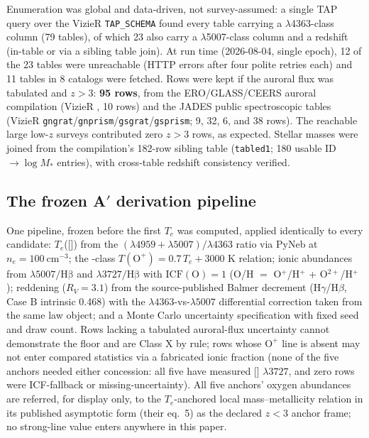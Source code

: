 \documentclass[twocolumn]{aastex702}
\newcommand{\te}{$T_e$}
\begin{document}
Enumeration was global and data-driven, not survey-assumed: a single TAP query over
the VizieR \texttt{TAP\_SCHEMA} found every table carrying a $\lambda$4363-class
column (79 tables), of which 23 also carry a $\lambda$5007-class column and a
redshift (in-table or via a sibling table join). At run time (2026-08-04, single
epoch), 12 of the 23 tables were unreachable (HTTP errors after four polite
retries each) and 11 tables in 8 catalogs were fetched. Rows were kept if the
auroral flux was tabulated and $z>3$: \textbf{95 rows}, from the ERO/GLASS/CEERS
auroral compilation (VizieR ,
10 rows) and the JADES public spectroscopic tables (VizieR
\texttt{gngrat}/\texttt{gnprism}/\texttt{gsgrat}/\texttt{gsprism}; 9, 32, 6, and 38
rows). The reachable large low-$z$ surveys contributed zero $z>3$ rows, as
expected. Stellar masses were joined from the compilation's 182-row sibling table
(\texttt{tabled1}; 180 usable ID$\to\log M_*$ entries), with cross-table redshift
consistency verified.

\subsection{The frozen A$'$ derivation pipeline}\label{sec:pipeline}

One pipeline, frozen before the first \te{} was computed, applied identically to
every candidate: \te{}([]) from the
$(\lambda4959+\lambda5007)/\lambda4363$ ratio via PyNeb \citep{Luridiana2015} at
$n_e=100\ \mathrm{cm^{-3}}$; the \citet{Izotov2006}-class $T(\mathrm{O^+}) =
0.7\,T_e + 3000$ K relation; ionic abundances from
$\lambda5007/\mathrm{H\beta}$ and $\lambda3727/\mathrm{H\beta}$ with
$\mathrm{ICF(O)}=1$ (O/H $=$ O$^+$/H$^+$ + O$^{2+}$/H$^+$); \citet{Cardelli1989}
reddening ($R_V=3.1$) from the source-published Balmer decrement
(H$\gamma$/H$\beta$, Case B intrinsic 0.468) with the
$\lambda4363$-vs-$\lambda5007$ differential correction taken from the same law
object; and a Monte Carlo uncertainty specification with fixed seed and draw count.
Rows lacking a tabulated auroral-flux uncertainty cannot demonstrate the floor and
are Class X by rule; rows whose $\mathrm{O^+}$ line is absent may not enter
compared statistics via a fabricated ionic fraction (none of the five anchors
needed either concession: all five have measured [] $\lambda3727$, and
zero rows were ICF-fallback or missing-uncertainty). All five anchors' oxygen
abundances are referred, for display only, to the \citet{AndrewsMartini2013}
\te{}-anchored local mass--metallicity relation in its published asymptotic form
(their eq.~5) as the declared $z<3$ anchor frame; no strong-line value enters
anywhere in this paper.
\end{document}
